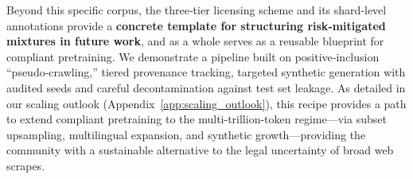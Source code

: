 Beyond this specific corpus, the three‑tier licensing scheme and its shard‑level annotations
provide a \textbf{concrete template for structuring risk‑mitigated mixtures in future work}, and
\MixtureVitae{} as a whole serves as a reusable blueprint for compliant pretraining.
We demonstrate a pipeline built on positive‑inclusion “pseudo‑crawling,” tiered provenance
tracking, targeted synthetic generation with audited seeds and careful decontamination against test set leakage. As detailed in our scaling outlook (Appendix~\ref{app:scaling_outlook}), this recipe provides a path to extend compliant pretraining to the multi-trillion-token regime---via subset upsampling, multilingual expansion, and synthetic growth---providing the community with a sustainable alternative to the legal uncertainty of broad web scrapes.